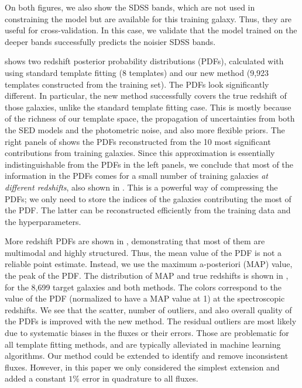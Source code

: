 \documentclass[aps,prd,showpacs,superscriptaddress,groupedaddress]{revtex4}  %
\begin{document}
On both figures, we also show the SDSS bands, which are not used in constraining the model but are available for this training galaxy. 
Thus, they are useful for cross-validation.
In this case, we validate that the model trained on the deeper bands successfully predicts the noisier SDSS bands.

 shows two redshift posterior probability distributions (PDFs), calculated with  using standard template fitting (8 templates) and our new method (9,923 templates constructed from the training set).
The PDFs look significantly different.
In particular, the new method successfully covers the true redshift of those galaxies, unlike the standard template fitting case.
This is mostly because of the richness of our template space, the propagation of uncertainties from both the SED models and the photometric noise, and also more flexible priors.
The right panels of  shows the PDFs reconstructed from the 10 most significant contributions from training galaxies. 
Since this approximation is essentially indistinguishable from the PDFs in the left panels, we conclude that most of the information in the PDFs comes for a small number of training galaxies \textit{at different redshifts}, also shown in .
This is a powerful way of compressing the PDFs; we only need to store the indices of the galaxies contributing the most of the PDF. 
The latter can be reconstructed efficiently from the training data and the hyperparameters.

More redshift PDFs are shown in , demonstrating that most of them are multimodal and highly structured.
Thus, the mean value of the PDF is not a reliable point estimate.
Instead, we use the maximum a-posteriori (MAP) value, \ie the peak of the PDF.
The distribution of MAP and true redshifts is shown in , for the 8,699 target galaxies and both methods.
The colors correspond to the value of the PDF (normalized to have a MAP value at 1) at the spectroscopic redshifts.
We see that the scatter, number of outliers, and also overall quality of the PDFs is improved with the new method.
The residual outliers are most likely due to systematic biases in the fluxes or their errors. 
Those are problematic for all template fitting methods, and are typically alleviated in machine learning \photoz algorithms.
Our method could be extended to identify and remove inconsistent fluxes.
However, in this paper we only considered the simplest extension and added a constant $1\%$ error in quadrature to all fluxes.
\end{document}
